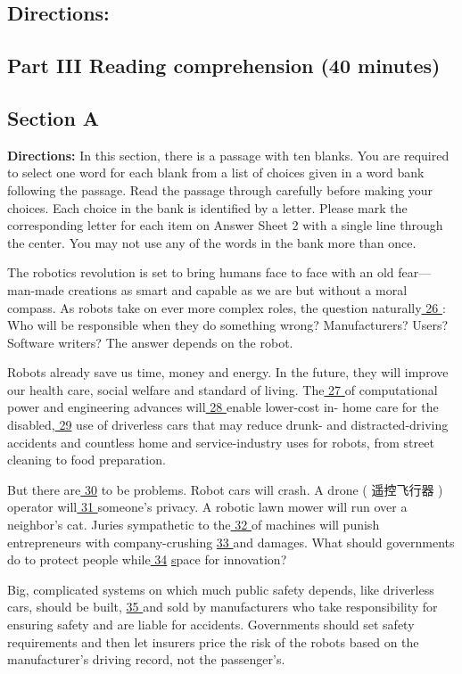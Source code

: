 \documentclass[UTF8,11pt]{ctexart}
\begin{document}
\subsection*{\textbf{Directions:}}


\subsection*{\textbf{Part III Reading comprehension (40 minutes)}}


\subsection*{\textbf{Section A}}


\textbf{Directions:} In this section, there is a passage with ten blanks. You are required to select one word for each blank from a list of choices given in a word bank following the passage. Read the passage through carefully before making your choices. Each choice in the bank is identified by a letter. Please mark the corresponding letter for each item on Answer Sheet 2 with a single line through the center. You may not use any of the words in the bank more than once.


The robotics revolution is set to bring humans face to face with an old fear—man-made creations as smart and capable as we are but without a moral compass. As robots take on ever more complex roles, the question naturally\uline{ 26 }: Who will be responsible when they do something wrong? Manufacturers? Users? Software writers? The answer depends on the robot.


Robots already save us time, money and energy. In the future, they will improve our health care, social welfare and standard of living. The\uline{ 27 }of computational power and engineering advances will\uline{ 28 }enable lower-cost in- home care for the disabled,\uline{ 29} use of driverless cars that may reduce drunk- and distracted-driving accidents and countless home and service-industry uses for robots, from street cleaning to food preparation.


But there are\uline{ 30} to be problems. Robot cars will crash. A drone ( 遥控飞行器 ) operator will\uline{ 31 }someone’s privacy. A robotic lawn mower will run over a neighbor’s cat. Juries sympathetic to the\uline{ 32 }of machines will punish entrepreneurs with company-crushing \uline{33 }and damages. What should governments do to protect people while\uline{ 34} \uline{s}pace for innovation?


Big, complicated systems on which much public safety depends, like driverless cars, should be built, \uline{35 }and sold by manufacturers who take responsibility for ensuring safety and are liable for accidents. Governments should set safety requirements and then let insurers price the risk of the robots based on the manufacturer’s driving record, not the passenger’s.
\end{document}

